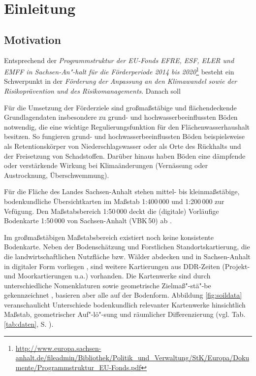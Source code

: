 \section{Einleitung}
\subsection{Motivation}
Entsprechend der \textit{Programmstruktur der EU-Fonds EFRE, ESF, ELER und EMFF in Sachsen-An"-halt für die Förderperiode 2014 bis 2020}\footnote{\url{http://www.europa.sachsen-anhalt.de/fileadmin/Bibliothek/Politik_und_Verwaltung/StK/Europa/Dokumente/Programmstruktur_EU-Fonds.pdf}} besteht ein Schwerpunkt in der 
\textit{Förderung der Anpassung an den Klimawandel sowie der Risikoprävention und des Risikomanagements}. Danach soll \

Für die Umsetzung der Förderziele sind großmaßstäbige und flächendeckende Grundlagendaten insbesondere zu grund- und hochwasserbeeinflussten Böden notwendig, die eine wichtige Regulierungsfunktion für den Flächenwasserhaushalt besitzen. So fungieren grund- und hochwasserbeeinflussten Böden beispielsweise als Retentionskörper von Niederschlagswasser oder als Orte des Rückhalts und der Freisetzung von Schadstoffen. Darüber hinaus haben Böden eine dämpfende oder verstärkende Wirkung bei Klimaänderungen (Vernässung oder Austrocknung, Überschwemmung).\

Für die Fläche des Landes Sachsen-Anhalt stehen mittel- bis kleinmaßstäbige, bodenkundliche Übersichtkarten im Maßstab 1:400\,000 und 1:200\,000 zur Vefügung. Den Maßstabsbereich 1:50\,000 deckt die (digitale) Vorläufige Bodenkarte 1:50\,000 von Sachsen-Anhalt (VBK\,50) ab \citep{Hartmann2005,Hartmann2006,Hartmann2014}.

Im großmaßstäbigen Maßstabsbereich existiert noch keine konsistente Bodenkarte. Neben der Bodenschätzung und Forstlichen Standortskartierung, die die landwirtschaftlichen Nutzfläche bzw. Wälder abdecken und in Sachsen-Anhalt in digitaler Form vorliegen \citep{Gutteck1999,Hartmann2006},  sind weitere Kartierungen aus DDR-Zeiten (Projekt- und Moorkartierungen u.a.) vorhanden. Die Kartenwerke sind durch unterschiedliche Nomenklaturen sowie geometrische Zielmaß"-stä"-be gekennzeichnet \citep{Moeller-etal2012catena,Hartmann2014}, basieren aber alle auf der Bodenform. Abbildung \ref{fig:soildata} veranschaulicht Unterschiede bodenkundlich relevanter Kartenwerke hinsichtlich Maßstab, geometrischer Auf"-lö"-sung und räumlicher Differenzierung (vgl. Tab. \ref{tab:daten}, S. \pageref{tab:daten}). 

